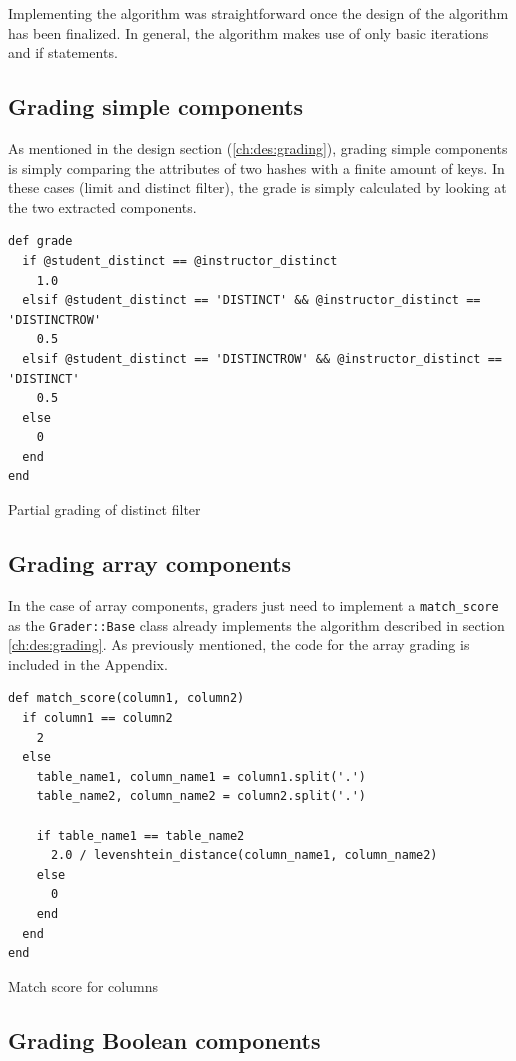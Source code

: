 Implementing the algorithm was straightforward once the design of the algorithm has been finalized. In general, the algorithm makes use of only basic iterations and if statements.

\subsection{Grading simple components}
As mentioned in the design section (\ref{ch:des:grading}), grading simple components is simply comparing the attributes of two  hashes with a finite amount of keys. In these cases (limit and distinct filter), the grade is simply calculated by looking at the two extracted components.

\begin{code}
\begin{verbatim}
def grade
  if @student_distinct == @instructor_distinct
    1.0
  elsif @student_distinct == 'DISTINCT' && @instructor_distinct == 'DISTINCTROW'
    0.5
  elsif @student_distinct == 'DISTINCTROW' && @instructor_distinct == 'DISTINCT'
    0.5
  else
    0
  end
end
\end{verbatim}
\caption{Partial grading of distinct filter}
\end{code}

\subsection{Grading array components}

In the case of array components, graders just need to implement a \texttt{match_score} as the \texttt{Grader::Base} class already implements the algorithm described in section \ref{ch:des:grading}. As previously mentioned, the code for the array grading is included in the Appendix.

\begin{code}
\begin{verbatim}
def match_score(column1, column2)
  if column1 == column2
    2
  else
    table_name1, column_name1 = column1.split('.')
    table_name2, column_name2 = column2.split('.')

    if table_name1 == table_name2
      2.0 / levenshtein_distance(column_name1, column_name2)
    else
      0
    end
  end
end
\end{verbatim}

\caption{Match score for columns}
\end{code}

\subsection{Grading Boolean components}

